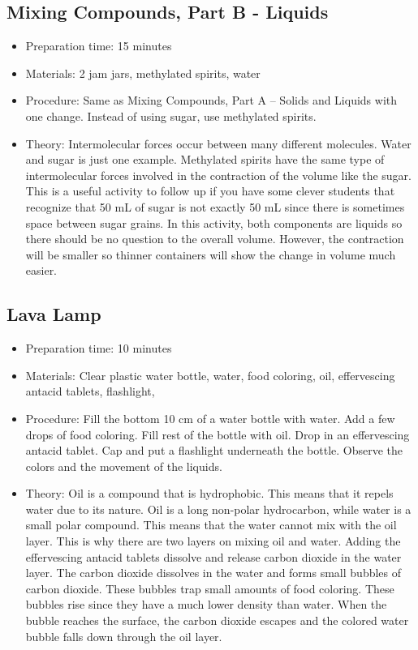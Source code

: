 \subsection{Mixing Compounds, Part B - Liquids}
\begin{itemize}
\item{Preparation time: 15 minutes}
\item{Materials: 2 jam jars, methylated spirits, water}
\item{Procedure: Same as Mixing Compounds, Part A – Solids and Liquids  with one change. Instead of using sugar, use methylated spirits. }
\item{Theory: Intermolecular forces occur between many different molecules. Water and sugar is just one example. Methylated spirits have the same type of intermolecular forces involved in the contraction of the volume like the sugar. This is a useful activity to follow up if you have some clever students that recognize that 50 mL of sugar is not exactly 50 mL since there is sometimes space between sugar grains. In this activity, both components are liquids so there should be no question to the overall volume. However, the contraction will be smaller so thinner containers will show the change in volume much easier.}
\end{itemize}

\subsection{Lava Lamp}
\begin{itemize}
\item{Preparation time: 10 minutes}
\item{Materials: Clear plastic water bottle, water, food coloring, oil, effervescing antacid tablets, flashlight,}
\item{Procedure: Fill the bottom 10 cm of a water bottle with water. Add a few drops of food coloring. Fill rest of the bottle with oil. Drop in an effervescing antacid tablet. Cap and put a flashlight underneath the bottle. Observe the colors and the movement of the liquids.}
\item{Theory: Oil is a compound that is hydrophobic. This means that it repels water due to its nature. Oil is a long non-polar hydrocarbon, while water is a small polar compound. This means that the water cannot mix with the oil layer. This is why there are two layers on mixing oil and water. Adding the effervescing antacid tablets dissolve and release carbon dioxide in the water layer. The carbon dioxide dissolves in the water and forms small bubbles of carbon dioxide. These bubbles trap small amounts of food coloring. These bubbles rise since they have a much lower density than water. When the bubble reaches the surface, the carbon dioxide escapes and the colored water bubble falls down through the oil layer.}
\end{itemize}

